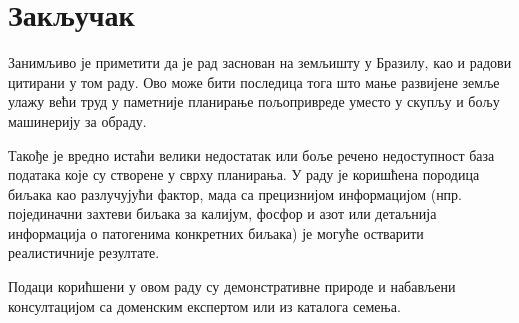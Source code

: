 \documentclass[12pt,fleqn]{article}
\begin{document}
\section{Закључак}
Занимљиво је приметити да је рад \cite{geraldi} заснован на земљишту у Бразилу, као и радови цитирани у том раду. Ово може бити последица тога што мање развијене земље улажу већи труд у паметније планирање пољопривреде уместо у скупљу и бољу машинерију за обраду.

Такође је вредно истаћи велики недостатак или боље речено недоступност база података које су створене у сврху планирања. У раду је коришћена породица биљака као разлучујући фактор, мада са прецизнијом информацијом (нпр. појединачни захтеви биљака за калијум, фосфор и азот или детаљнија информација о патогенима конкретних биљака) је могуће остварити реалистичније резултате.

Подаци корићшени у овом раду су демонстративне природе и набављени консултацијом са доменским експертом или из каталога семења.

\printbibliography
\end{document}
